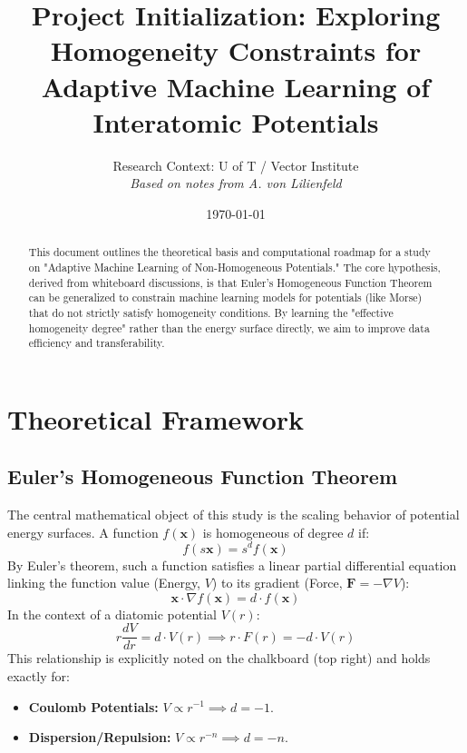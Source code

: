 \documentclass[11pt, a4paper]{article}
\title{\textbf{Project Initialization: Exploring Homogeneity Constraints for Adaptive Machine Learning of Interatomic Potentials}}
\author{Research Context: U of T / Vector Institute \\ \textit{Based on notes from A. von Lilienfeld}}
\date{\today}
\begin{document}
\maketitle

\begin{abstract}
This document outlines the theoretical basis and computational roadmap for a study on "Adaptive Machine Learning of Non-Homogeneous Potentials." The core hypothesis, derived from whiteboard discussions, is that Euler's Homogeneous Function Theorem can be generalized to constrain machine learning models for potentials (like Morse) that do not strictly satisfy homogeneity conditions. By learning the "effective homogeneity degree" rather than the energy surface directly, we aim to improve data efficiency and transferability.
\end{abstract}

\section{Theoretical Framework}

\subsection{Euler's Homogeneous Function Theorem}
The central mathematical object of this study is the scaling behavior of potential energy surfaces. A function $f(\mathbf{x})$ is homogeneous of degree $d$ if:
\begin{equation}
    f(s \mathbf{x}) = s^d f(\mathbf{x})
\end{equation}
By Euler's theorem, such a function satisfies a linear partial differential equation linking the function value (Energy, $V$) to its gradient (Force, $\mathbf{F} = -\nabla V$):
\begin{equation}
    \mathbf{x} \cdot \nabla f(\mathbf{x}) = d \cdot f(\mathbf{x})
\end{equation}
In the context of a diatomic potential $V(r)$:
\begin{equation}
    r \frac{dV}{dr} = d \cdot V(r) \implies r \cdot F(r) = -d \cdot V(r)
\end{equation}
This relationship is explicitly noted on the chalkboard (top right) and holds exactly for:
\begin{itemize}
    \item \textbf{Coulomb Potentials:} $V \propto r^{-1} \implies d = -1$.
    \item \textbf{Dispersion/Repulsion:} $V \propto r^{-n} \implies d = -n$.
\end{itemize}
\end{document}
